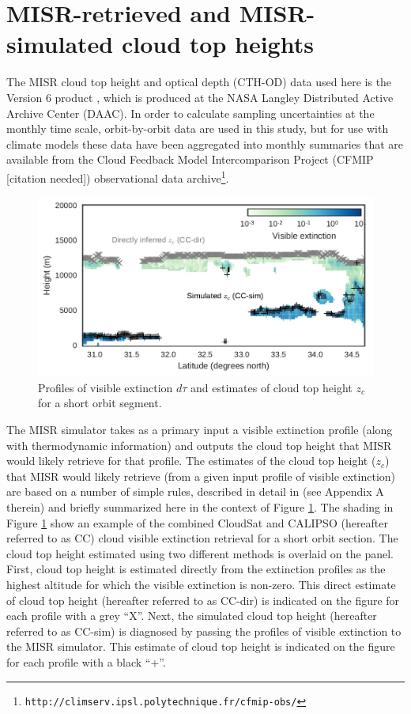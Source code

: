 \section{MISR-retrieved and MISR-simulated cloud top heights} \label{misr_retrievals}
The MISR cloud top height and optical depth (CTH-OD) data used here is the Version 6 product \citep{marchand_et_al_2010}, which is produced at the NASA Langley Distributed Active Archive Center (DAAC). In order to calculate sampling uncertainties at the monthly time scale, orbit-by-orbit data are used in this study, but for use with climate models these data have been aggregated into monthly summaries that are available from the Cloud Feedback Model Intercomparison Project (CFMIP [citation needed]) observational data archive\footnote{\tt http://climserv.ipsl.polytechnique.fr/cfmip-obs/}. 

\begin{figure}
\centering
\includegraphics[width=\columnwidth]{graphics/misr_sim_example.pdf}
\caption{Profiles of visible extinction $d\tau$ and estimates of cloud top height $z_c$ for a short orbit segment.}
\label{misr_sim_example}
\end{figure}

The MISR simulator takes as a primary input a visible extinction profile (along with thermodynamic information) and outputs the cloud top height that MISR would likely retrieve for that profile. The estimates of the cloud top height ($z_c$) that MISR would likely retrieve (from a given input profile of visible extinction) are based on a number of simple rules, described in detail in \cite{marchand_and_ackerman_2010} (see Appendix A therein) and briefly summarized here in the context of Figure \ref{misr_sim_example}. The shading in Figure \ref{misr_sim_example} show an example of the combined CloudSat and CALIPSO (hereafter referred to as CC) cloud visible extinction retrieval for a short orbit section. The cloud top height estimated using two different methods is overlaid on the panel. First, cloud top height is estimated directly from the extinction profiles as the highest altitude for which the visible extinction is non-zero. This direct estimate of cloud top height (hereafter referred to as CC-dir) is indicated on the figure for each profile with a grey ``X''. Next, the simulated cloud top height (hereafter referred to as CC-sim) is diagnosed by passing the profiles of visible extinction to the MISR simulator. This estimate of cloud top height is indicated on the figure for each profile with a black ``+''. 

